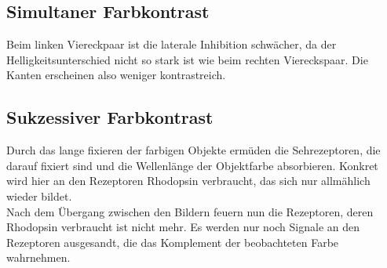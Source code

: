 \documentclass[a4paper]{article}
\begin{document}
\subsection{Simultaner Farbkontrast}
Beim linken Viereckpaar ist die laterale Inhibition schwächer, da der Helligkeitsunterschied nicht so stark ist wie beim rechten Viereckspaar. Die Kanten erscheinen also weniger kontrastreich.
\subsection{Sukzessiver Farbkontrast}
Durch das lange fixieren der farbigen Objekte ermüden die Sehrezeptoren, die darauf fixiert sind und die Wellenlänge der Objektfarbe absorbieren. Konkret wird hier an den Rezeptoren Rhodopsin verbraucht, das sich nur allmählich wieder bildet.\\
Nach dem Übergang zwischen den Bildern feuern nun die Rezeptoren, deren Rhodopsin verbraucht ist nicht mehr. Es werden nur noch Signale an den Rezeptoren ausgesandt, die das Komplement der beobachteten Farbe wahrnehmen.
\printbibliography
\end{document}
